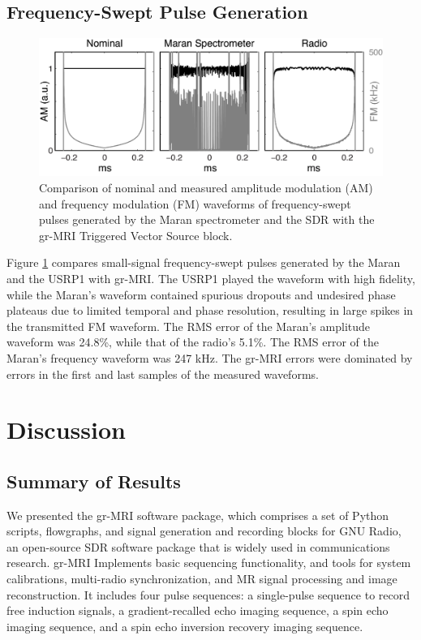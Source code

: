 \documentclass[10pt,letterpaper]{article}
\begin{document}
\subsection*{Frequency-Swept Pulse Generation}

\begin{figure}[h]
\begin{center}
\includegraphics[width = 1\textwidth,trim=0 0 0 0,clip=false]{frequency_sweep.png}
\caption{{Comparison of nominal and measured amplitude modulation (AM) and frequency modulation (FM) waveforms of frequency-swept pulses generated by the Maran spectrometer and the SDR
with the gr-MRI Triggered Vector Source block.}}
\label{fig:f_sweep}
\end{center}
\end{figure}

Figure \ref{fig:f_sweep} compares small-signal frequency-swept pulses generated by the Maran and the USRP1 with gr-MRI. 
The USRP1 played the waveform with high fidelity, 
while the Maran’s waveform contained spurious dropouts and undesired phase plateaus due to limited temporal and phase resolution, 
resulting in large spikes in the transmitted FM waveform.
The RMS error of the Maran's amplitude waveform was 24.8\%, 
while that of the radio's 5.1\%. 
The RMS error of the Maran's frequency waveform was 247 kHz.
The gr-MRI errors were dominated by errors in the first and last samples of the measured waveforms.

\section*{Discussion}
\subsection*{Summary of Results}
We presented the gr-MRI software package, which comprises a set of Python scripts, flowgraphs, and 
signal generation and recording blocks for GNU Radio, 
an open-source SDR software package that is widely used in communications research. 
gr-MRI Implements basic sequencing functionality, 
and tools for system calibrations, multi-radio synchronization, and 
MR signal processing and image reconstruction. 
It includes four pulse sequences: 
a single-pulse sequence to record free induction signals, 
a gradient-recalled echo imaging sequence, a spin echo imaging sequence,
and a spin echo inversion recovery imaging sequence.
\end{document}
